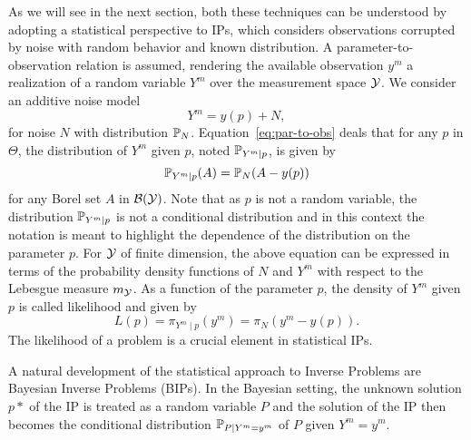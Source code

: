 As we will see in the next section, both these techniques can be understood by adopting a statistical perspective to IPs, which considers observations corrupted by noise with random behavior and known distribution.
A parameter-to-observation relation is assumed, rendering the available observation $y^m$ a realization of a random variable $Y^m$ over the measurement space $\mathcal Y$.
We consider an additive noise model
\begin{equation}\label{eq:par-to-obs}
    Y^m = y(p) + N,
\end{equation}
for noise $N$ with distribution $\mathbb P _N$. \newline
Equation~\eqref{eq:par-to-obs} deals that for any $p$ in $\Theta$, the distribution of $Y^m$ given $p$, noted $\mathbb P_{Y^m \mid p}$, is given by 
\[
    \mathbb P_{Y^m \mid p} (A) = \mathbb P_N (A-y(p))
\]
for any Borel set $A$ in $\mathcal B (\mathcal Y)$. 
Note that as $p$ is not a random variable, the distribution $\mathbb P_{Y^m \mid p}$ is not a conditional distribution and in this context the notation is meant to highlight the dependence of the distribution on the parameter $p$. \newline
For $\mathcal Y$ of finite dimension, the above equation can be expressed in terms of the probability density functions of $N$ and $Y^m$ with respect to the Lebesgue measure $m_\mathcal Y$.
As a function of the parameter $p$, the density of $Y^m$ given $p$ is called likelihood and given by
\begin{equation}\label{eq:likelihood}
    L(p) = \pi_{Y^m \mid p} (y^m) = \pi_N(y^m - y(p)).
\end{equation}
The likelihood of a problem is a crucial element in statistical IPs. \medskip

A natural development of the statistical approach to Inverse Problems are Bayesian Inverse Problems (BIPs). 
In the Bayesian setting, the unknown solution $p*$ of the IP is treated as a random variable $P$ and the solution of the IP then becomes the conditional distribution $\mathbb P_{P \mid Y^m=y^m} $ of $P$ given $Y^m=y^m$.

